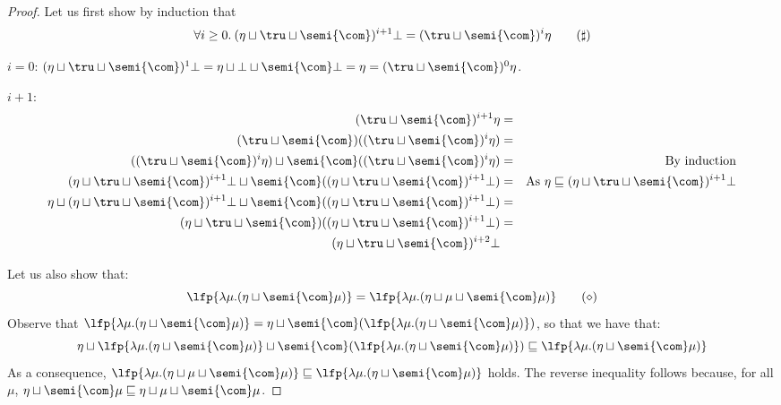 \begin{proof}
  Let us first show by induction that 
  \begin{equation}\label{prop2}
    \forall i\geq 0.\: (\eta \sqcup \tru \sqcup \semi{\com})^{i+1} \bot = (\tru \sqcup \semi{\com})^{i} \eta \tag{\(\sharp\)}
  \end{equation}

  \noindent
  \(i=0\): \( (\eta \sqcup \tru \sqcup \semi{\com})^{1} \bot = \eta \sqcup \bot \sqcup \semi{\com}\bot = \eta = 
  (\tru \sqcup \semi{\com})^{0} \eta\).
  
  \noindent
  \(i+1\):  
  \begin{align*}
    (\tru \sqcup \semi{\com})^{i+1} \eta & = & \\
    (\tru \sqcup \semi{\com})((\tru \sqcup \semi{\com})^{i} \eta) & = & \\
    ((\tru \sqcup \semi{\com})^{i} \eta) \sqcup  \semi{\com}((\tru \sqcup \semi{\com})^{i} \eta) & = & \text{By induction}\\
    (\eta \sqcup \tru \sqcup \semi{\com})^{i+1} \bot \sqcup \semi{\com}((\eta \sqcup \tru \sqcup \semi{\com})^{i+1}\bot ) &= & \text{As } \eta \sqsubseteq (\eta \sqcup \tru \sqcup \semi{\com})^{i+1} \bot \\
    \eta \sqcup (\eta \sqcup \tru \sqcup \semi{\com})^{i+1} \bot \sqcup \semi{\com}((\eta \sqcup \tru \sqcup \semi{\com})^{i+1}\bot ) & = & \\
    (\eta \sqcup \tru \sqcup \semi{\com}) ((\eta \sqcup \tru \sqcup \semi{\com})^{i+1} \bot) & = & \\
    (\eta \sqcup \tru \sqcup \semi{\com})^{i+2} \bot & &
  \end{align*}

  Let us also show that:
  \begin{equation}\label{prop3}
    \lfp{\lambda \mu. (\eta \sqcup \semi{\com} \mu)} =
    \lfp{\lambda \mu. (\eta \sqcup \mu \sqcup \semi{\com} \mu)}\tag{\(\diamond\)}
  \end{equation}
  Observe that \(\lfp{\lambda \mu. (\eta \sqcup \semi{\com} \mu)} = \eta \sqcup  \semi{\com}(\lfp{\lambda \mu. (\eta \sqcup \semi{\com} \mu)})\), so that we have that:
  \[
  \eta \sqcup  \lfp{\lambda \mu. (\eta \sqcup \semi{\com} \mu)} \sqcup \semi{\com}(\lfp{\lambda \mu. (\eta \sqcup \semi{\com} \mu)})
  \sqsubseteq \lfp{\lambda \mu. (\eta \sqcup \semi{\com} \mu)}
  \]
  As a consequence, \(\lfp{\lambda \mu. (\eta \sqcup \mu \sqcup \semi{\com} \mu)}\sqsubseteq \lfp{\lambda \mu. (\eta \sqcup \semi{\com} \mu)}\) holds. The reverse inequality follows because, for all \(\mu\), 
  \(\eta \sqcup \semi{\com} \mu \sqsubseteq \eta \sqcup \mu \sqcup \semi{\com} \mu\).


\end{proof}
